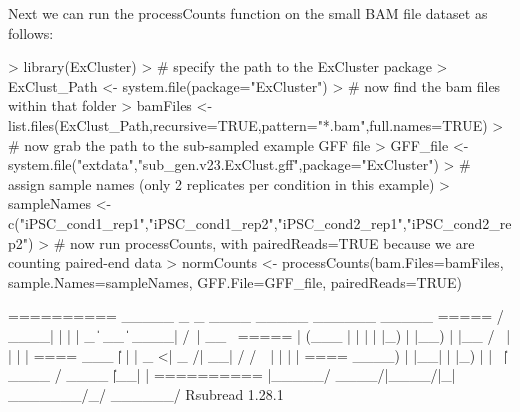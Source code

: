 \documentclass[12pt]{article}
\begin{document}
Next we can run the processCounts function on the small BAM file dataset as follows:\\

\begin{scriptsize}
\begin{Schunk}
\begin{Sinput}
> library(ExCluster)
> # specify the path to the ExCluster package
> ExClust_Path <- system.file(package="ExCluster")
> # now find the bam files within that folder
> bamFiles <- list.files(ExClust_Path,recursive=TRUE,pattern="*.bam",full.names=TRUE)
> # now grab the path to the sub-sampled example GFF file
> GFF_file <- system.file("extdata","sub_gen.v23.ExClust.gff",package="ExCluster")
> # assign sample names (only 2 replicates per condition in this example)
> sampleNames <- c("iPSC_cond1_rep1","iPSC_cond1_rep2","iPSC_cond2_rep1","iPSC_cond2_rep2")
> # now run processCounts, with pairedReads=TRUE because we are counting paired-end data
> normCounts <- processCounts(bam.Files=bamFiles, sample.Names=sampleNames, GFF.File=GFF_file, pairedReads=TRUE)
\end{Sinput}
\begin{Soutput}
        ==========     _____ _    _ ____  _____  ______          _____  
        =====         / ____| |  | |  _ \|  __ \|  ____|   /\   |  __ \ 
          =====      | (___ | |  | | |_) | |__) | |__     /  \  | |  | |
            ====      \___ \| |  | |  _ <|  _  /|  __|   / /\ \ | |  | |
              ====    ____) | |__| | |_) | | \ \| |____ / ____ \| |__| |
        ==========   |_____/ \____/|____/|_|  \_\______/_/    \_\_____/
       Rsubread 1.28.1


\end{Soutput}
\end{Schunk}
\end{scriptsize}
\end{document}
